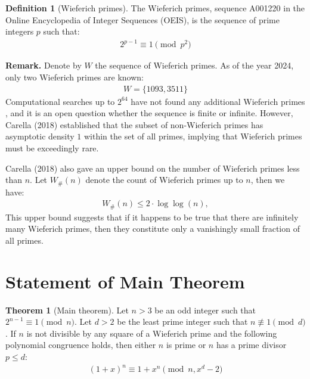 \documentclass{article}
\theoremstyle{plain}
\theoremstyle{definition}
\newtheorem{definition}{Definition}
\newtheorem{theorem}{Theorem}
\begin{document}
\begin{definition}[Wieferich primes] \label{definition:wieferichprimes}
The Wieferich primes, sequence A001220 \cite{oeiswieferichprimes} in the Online Encyclopedia of Integer Sequences (OEIS), is the sequence of prime integers $p$ such that:
\begin{align}
    2^{p-1} \equiv 1 \pmod{p^2}
\end{align}

\textbf{Remark.}
Denote by $W$ the sequence of Wieferich primes. As of the year 2024, only two Wieferich primes are known:
\begin{align}
    W = \{ 1093, 3511 \}
\end{align}
Computational searches up to $2^{64}$ have not found any additional Wieferich primes \cite{primegridww}, and it is an open question whether the sequence is finite or infinite. However, Carella (2018) \cite{carella2018results} established that the subset of non-Wieferich primes has asymptotic density $1$ within the set of all primes, implying that Wieferich primes must be exceedingly rare.

Carella (2018) \cite{carella2018results} also gave an upper bound on the number of Wieferich primes less than $n$. Let $W_{\#}(n)$ denote the count of Wieferich primes up to $n$, then we have:
\begin{align}
    W_{\#}(n) \leq 2 \cdot \log \log (n),
\end{align}
This upper bound suggests that if it happens to be true that there are infinitely many Wieferich primes, then they constitute only a vanishingly small fraction of all primes.
\end{definition}

\section{Statement of Main Theorem}
\begin{theorem}[Main theorem] \label{theorem:main}
Let $n > 3$ be an odd integer such that $2^{n-1} \equiv 1 \pmod{n}$. Let $d > 2$ be the least prime integer such that $n \not\equiv 1 \pmod{d}$. If $n$ is not divisible by any square of a Wieferich prime and the following polynomial congruence holds, then either $n$ is prime or $n$ has a prime divisor $p \leq d$:
\begin{align}
(1 + x)^n \equiv 1 + x^n \pmod{n, x^d - 2}
\end{align}
\end{theorem}
\end{document}
